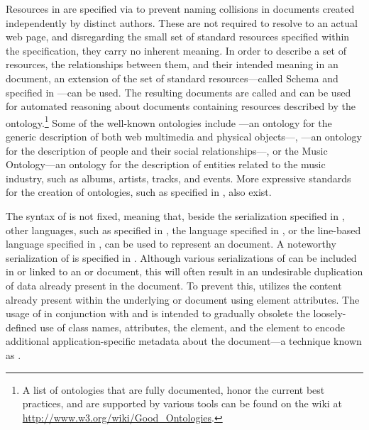 \documentclass{book}
\begin{document}
Resources in  are specified via  to prevent naming
collisions in  documents created independently by distinct authors.
These  are not required to resolve to an actual web page, and
disregarding the small set of standard resources specified within the
 specification, they carry no inherent meaning. In order to
describe a set of resources, the relationships between them, and their intended
meaning in an  document, an extension of the set of standard
resources---called  Schema and specified in
\cite{brickley04}---can be used. The resulting documents are called
  and can be used for automated
reasoning about  documents containing resources described by the
ontology.\footnote{
  A list of ontologies that are fully documented, honor the current best
  practices, and are supported by various tools can be found on the
   wiki at \url{http://www.w3.org/wiki/Good_Ontologies}.
} Some of the well-known ontologies include ---an ontology for the
generic description of both web multimedia and physical objects---,
---an ontology for the description of people and their social
relationships---, or the Music Ontology---an ontology for the description of
entities related to the music industry, such as albums, artists, tracks, and
events. More expressive standards for the creation of ontologies, such as
 specified in \cite{mcguinness04}, also exist.

The syntax of  is not fixed, meaning that, beside the
 serialization specified in \cite{lassira99}, other languages,
such as  specified in \cite{sporny14}, the 
language specified in \cite{beckett14:turtle}, or the line-based 
language specified in \cite{beckett14:nt}, can be used to represent an
 document. A noteworthy serialization of  is
 specified in \cite{adida08}. Although various serializations of
 can be included in or linked to an  or
 document, this will often result in an undesirable duplication
of data already present in the document. To prevent this, 
utilizes the content already present within the underlying  or
 document using element attributes. The usage of 
in conjunction with  and  is intended to gradually
obsolete the loosely-defined use of  class names, attributes, the
 element, and the  element to encode additional
application-specific metadata about the document---a technique known as
.
\end{document}
